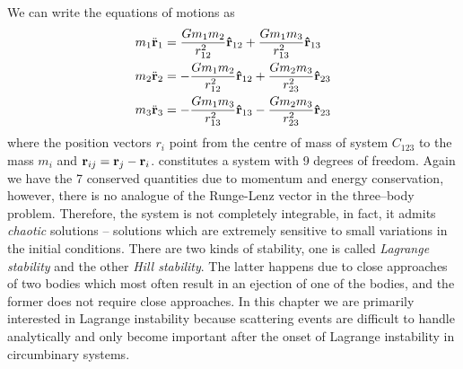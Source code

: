 \documentclass[twoside,openright,titlepage,numbers=noenddot,headinclude,%
                footinclude=true,cleardoublepage=empty,abstractoff, 
                BCOR=5mm,paper=a4,fontsize=11pt,%
                american,%
                ]{scrreprt}%
\begin{document}
We can write the equations of motions as
\begin{equation}
\begin{aligned}
    m_1\ddot{\boldsymbol{\mathbf{r}}}_1&= \frac{Gm_1m_2}{r^2_{12}} \boldsymbol{\mathbf{\hat r}}_{12}+
    \frac{Gm_1m_3}{r^2_{13}} \boldsymbol{\mathbf{\hat r}}_{13}\\
    m_2\ddot{\boldsymbol{\mathbf{r}}}_2&= -\frac{Gm_1m_2}{r^2_{12}} \boldsymbol{\mathbf{\hat r}}_{12}+
    \frac{Gm_2m_3}{r^2_{23}} \boldsymbol{\mathbf{\hat r}}_{23}\\
    m_3\ddot{\boldsymbol{\mathbf{r}}}_3&= -\frac{Gm_1m_3}{r^2_{13}} \boldsymbol{\mathbf{\hat r}}_{13}-
    \frac{Gm_2m_3}{r^2_{23}} \boldsymbol{\mathbf{\hat r}}_{23}
\label{eq:three_body_newton}
\end{aligned}
\end{equation}
where the position vectors $r_i$ point from the centre of mass of 
system $C_{123}$ to the mass $m_i$ and $\boldsymbol{\mathbf{r}}_{ij}=\boldsymbol{\mathbf{r}}_j-\boldsymbol{\mathbf{r}}_i$. 
 constitutes a system with 9 degrees of freedom.
Again we have the 7 conserved quantities due to momentum and energy 
conservation, however, there is no analogue of the Runge-Lenz vector
in the three--body problem. Therefore, the system is not completely
integrable, in fact, it admits \emph{chaotic} solutions -- solutions which
are extremely sensitive to small variations in the initial conditions. 
There are two kinds of stability, one is called \emph{Lagrange stability} 
and the other \emph{Hill stability}. The latter happens due to close
approaches of two bodies which most often result in an ejection of one
of the bodies, and the former does not require close approaches.
In this chapter we are primarily interested in Lagrange instability 
because scattering events are difficult to handle analytically
and only become important after the onset of Lagrange instability in 
circumbinary systems. 
\end{document}
